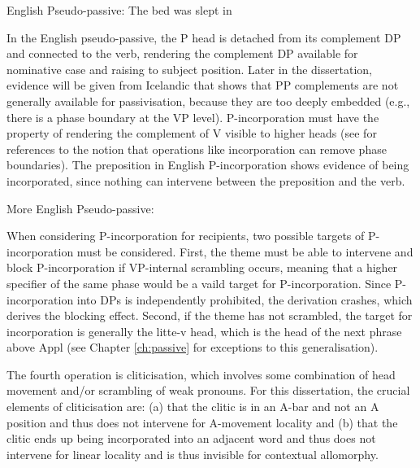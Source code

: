  \begin{exe}
	\ex English Pseudo-passive: The bed was slept in
\end{exe}

In the English pseudo-passive, the P head is detached from its complement DP and connected to the verb, rendering the complement DP available for nominative case and raising to subject position. Later in the dissertation, evidence will be given from Icelandic that shows that PP complements are not generally available for passivisation, because they are too deeply embedded (e.g., there is a phase boundary at the VP level). P-incorporation must have the property of rendering the complement of V visible to higher heads (see \citet{Alexiadou.2014} for references to the notion that operations like incorporation can remove phase boundaries). The preposition in English P-incorporation shows evidence of being incorporated, since nothing can intervene between the preposition and the verb.

\begin{exe}
	\ex More English Pseudo-passive:
	\begin{xlist}
	\end{xlist}
\end{exe}

When considering P-incorporation for recipients, two possible targets of P-incorporation must be considered. First, the theme must be able to intervene and block P-incorporation if VP-internal scrambling occurs, meaning that a higher specifier of the same phase would be a vaild target for P-incorporation. Since P-incorporation into DPs is independently prohibited, the derivation crashes, which derives the blocking effect. Second, if the theme has not scrambled, the target for incorporation is generally the litte-v head, which is the head of the next phrase above Appl (see Chapter \ref{ch:passive} for exceptions to this generalisation).

 The fourth operation is cliticisation, which involves some combination of head movement and/or scrambling of weak pronouns. For this dissertation, the crucial elements of cliticisation are: (a) that the clitic is in an A-bar and not an A position and thus does not intervene for A-movement locality and (b) that the clitic ends up being incorporated into an adjacent word and thus does not intervene for linear locality and is thus invisible for contextual allomorphy.

